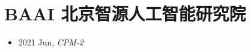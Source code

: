 \section{BAAI 北京智源人工智能研究院}\label{com:BAAI}

\begin{itemize}
    \item 2021 Jun, \textit{CPM-2}\cite{CPM-2}
\end{itemize}